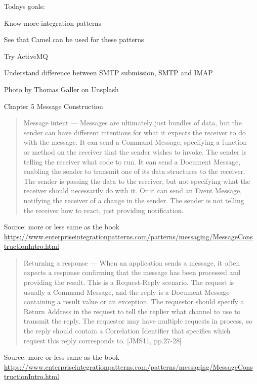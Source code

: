 \documentclass[Screen16to9,17pt]{foils}
\begin{document}


Todays goals:
\begin{list2}
\item Know more integration patterns
\item See that Camel can be used for these patterns
\item Try ActiveMQ
\item Understand difference between SMTP submission, SMTP and IMAP
\end{list2}

Photo by Thomas Galler on Unsplash



Chapter 5 Message Construction





\begin{quote}
Message intent — Messages are ultimately just bundles of data, but the sender can have different intentions for what it expects the receiver to do with the message. It can send a Command Message, specifying a function or method on the receiver that the sender wishes to invoke. The sender is telling the receiver what code to run. It can send a Document Message, enabling the sender to transmit one of its data structures to the receiver. The sender is passing the data to the receiver, but not specifying what the receiver should necessarily do with it. Or it can send an Event Message, notifying the receiver of a change in the sender. The sender is not telling the receiver how to react, just providing notification.
\end{quote}
Source:  more or less same as the book\\{\footnotesize
\url{https://www.enterpriseintegrationpatterns.com/patterns/messaging/MessageConstructionIntro.html}}




\begin{quote}
Returning a response — When an application sends a message, it often expects a response confirming that the message has been processed and providing the result. This is a Request-Reply scenario. The request is usually a Command Message, and the reply is a Document Message containing a result value or an exception. The requestor should specify a Return Address in the request to tell the replier what channel to use to transmit the reply. The requestor may have multiple requests in process, so the reply should contain a Correlation Identifier that specifies which request this reply corresponds to. [JMS11, pp.27-28]
\end{quote}
Source:  more or less same as the book\\{\footnotesize
\url{https://www.enterpriseintegrationpatterns.com/patterns/messaging/MessageConstructionIntro.html}}
\end{document}
